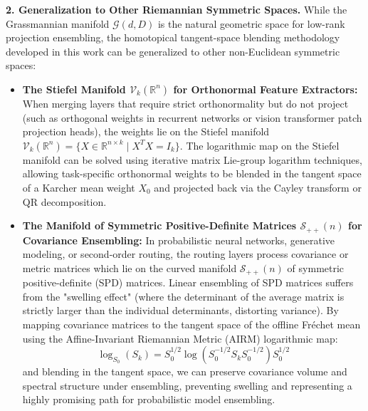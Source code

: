 \documentclass{article}
\theoremstyle{plain}
\theoremstyle{definition}
\theoremstyle{remark}
\begin{document}
\textbf{2. Generalization to Other Riemannian Symmetric Spaces.}
While the Grassmannian manifold $\mathcal{G}(d, D)$ is the natural geometric space for low-rank projection ensembling, the homotopical tangent-space blending methodology developed in this work can be generalized to other non-Euclidean symmetric spaces:
\begin{itemize}
    \item \textbf{The Stiefel Manifold $\mathcal{V}_k(\mathbb{R}^n)$ for Orthonormal Feature Extractors:} When merging layers that require strict orthonormality but do not project (such as orthogonal weights in recurrent networks or vision transformer patch projection heads), the weights lie on the Stiefel manifold $\mathcal{V}_k(\mathbb{R}^n) = \{ X \in \mathbb{R}^{n \times k} \mid X^T X = I_k \}$. The logarithmic map on the Stiefel manifold can be solved using iterative matrix Lie-group logarithm techniques, allowing task-specific orthonormal weights to be blended in the tangent space of a Karcher mean weight $X_0$ and projected back via the Cayley transform or QR decomposition.
    \item \textbf{The Manifold of Symmetric Positive-Definite Matrices $\mathcal{S}_{++}(n)$ for Covariance Ensembling:} In probabilistic neural networks, generative modeling, or second-order routing, the routing layers process covariance or metric matrices which lie on the curved manifold $\mathcal{S}_{++}(n)$ of symmetric positive-definite (SPD) matrices. Linear ensembling of SPD matrices suffers from the "swelling effect" (where the determinant of the average matrix is strictly larger than the individual determinants, distorting variance). By mapping covariance matrices to the tangent space of the offline Fr\'echet mean using the Affine-Invariant Riemannian Metric (AIRM) logarithmic map:
    \begin{equation}
        \log_{S_0}(S_k) = S_0^{1/2} \log\left( S_0^{-1/2} S_k S_0^{-1/2} \right) S_0^{1/2}
    \end{equation}
    and blending in the tangent space, we can preserve covariance volume and spectral structure under ensembling, preventing swelling and representing a highly promising path for probabilistic model ensembling.
\end{itemize}
\end{document}
